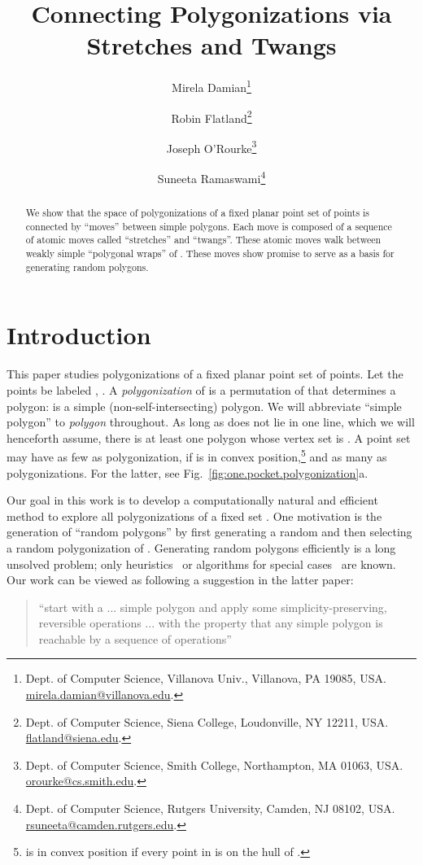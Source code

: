 \pdfoutput=1  \documentclass{article}
\title{Connecting Polygonizations via Stretches and Twangs}
\author{Mirela Damian\thanks{Dept. of Computer Science, Villanova Univ., Villanova,
    PA 19085, USA.
   \protect\url{mirela.damian@villanova.edu}.}
\and
Robin Flatland\thanks{Dept. of Computer Science, Siena College, Loudonville, NY 12211, USA.
    \protect\url{flatland@siena.edu}.}
\and
Joseph O'Rourke\thanks{Dept. of Computer Science, Smith College, Northampton, MA
      01063, USA.
      \protect\url{orourke@cs.smith.edu}.
}
\and
Suneeta Ramaswami\thanks{Dept. of Computer Science, Rutgers University,
       Camden, NJ 08102, USA.
   \protect\url{rsuneeta@camden.rutgers.edu}.}
}
\date{}
\newcommand{\seclab}[1]{\label{sec:#1}}
\newcommand{\figref}[1]{\ref{fig:#1}}
\begin{document}
\maketitle

\begin{abstract}
\noindent We show that the space of polygonizations of a fixed
planar point set  of  points is connected by
 ``moves'' between simple polygons.
Each move is composed of a sequence of
atomic moves called ``stretches'' and ``twangs''.
These atomic moves walk between weakly simple
``polygonal wraps'' of .
These moves show promise to serve as a basis for generating random polygons.
\end{abstract}

\maketitle

\section{Introduction}
\seclab{Introduction} This paper studies polygonizations of a fixed
planar point set  of  points. Let the  points be labeled
, . A \emph{polygonization} of  is a
permutation  of  that determines a polygon:
 is a simple
(non-self-intersecting) polygon. We will abbreviate ``simple
polygon'' to \emph{polygon} throughout.
As long as  does not lie in one line, which we will henceforth assume,
there is at least one
polygon whose vertex set is . A point set  may have as few as
 polygonization, if  is in convex position,\footnote{
  is in convex position if every point in  is on the hull of .
}
and as many as
 polygonizations. For the latter, see
Fig.~\figref{one.pocket.polygonization}a.

Our goal in this work is to develop a computationally natural and
efficient method to explore all polygonizations of a fixed set .
One motivation is the generation of ``random polygons'' by first
generating a random  and then selecting a random polygonization
of . Generating random polygons efficiently is a long unsolved
problem; only heuristics~\cite{ah-hgrp-96} or algorithms for special
cases~\cite{zssm-grpgv-96} are known. Our work can be viewed as
following a suggestion in the latter paper:
\begin{quotation}
\noindent ``start with a ... simple polygon and apply some
simplicity-preserving, reversible operations ... with the property
that any simple polygon is reachable by a sequence of operations''
\end{quotation}
\end{document}
